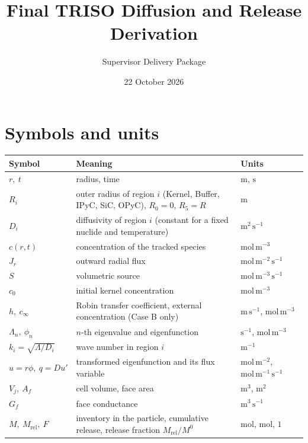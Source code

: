 \documentclass[11pt]{article}
\title{Final TRISO Diffusion and Release Derivation}
\author{Supervisor Delivery Package}
\date{22 October 2026}
\begin{document}
\maketitle

\section*{Symbols and units}
\begin{center}
\begin{tabular}{@{}>{\raggedright\arraybackslash}p{}>{\raggedright\arraybackslash}p{}>{\raggedright\arraybackslash}p{}@{}}
\toprule
Symbol & Meaning & Units\\
\midrule
$r,\ t$ & radius, time & $\mathrm{m}$, $\mathrm{s}$\\
$R_i$ & outer radius of region $i$ (Kernel, Buffer, IPyC, SiC, OPyC), $R_0=0$, $R_5=R$ & $\mathrm{m}$\\
$D_i$ & diffusivity of region $i$ (constant for a fixed nuclide and temperature) & $\mathrm{m^2\,s^{-1}}$\\
$c(r,t)$ & concentration of the tracked species & $\mathrm{mol\,m^{-3}}$\\
$J_r$ & outward radial flux & $\mathrm{mol\,m^{-2}\,s^{-1}}$\\
$S$ & volumetric source & $\mathrm{mol\,m^{-3}\,s^{-1}}$\\
$c_0$ & initial kernel concentration & $\mathrm{mol\,m^{-3}}$\\
$h,\ c_\infty$ & Robin transfer coefficient, external concentration (Case B only) & $\mathrm{m\,s^{-1}}$, $\mathrm{mol\,m^{-3}}$\\
$\Lambda_n,\ \phi_n$ & $n$-th eigenvalue and eigenfunction & $\mathrm{s^{-1}}$, $\mathrm{mol\,m^{-3}}$\\
$k_i=\sqrt{\Lambda/D_i}$ & wave number in region $i$ & $\mathrm{m^{-1}}$\\
$u=r\phi,\ q=Du'$ & transformed eigenfunction and its flux variable & $\mathrm{mol\,m^{-2}}$, $\mathrm{mol\,m^{-1}\,s^{-1}}$\\
$V_j,\ A_f$ & cell volume, face area & $\mathrm{m^3}$, $\mathrm{m^2}$\\
$G_f$ & face conductance & $\mathrm{m^3\,s^{-1}}$\\
$M,\ M_{\mathrm{rel}},\ F$ & inventory in the particle, cumulative release, release fraction $M_{\mathrm{rel}}/M^0$ & $\mathrm{mol}$, $\mathrm{mol}$, $1$\\
\bottomrule
\end{tabular}
\end{center}
\end{document}
